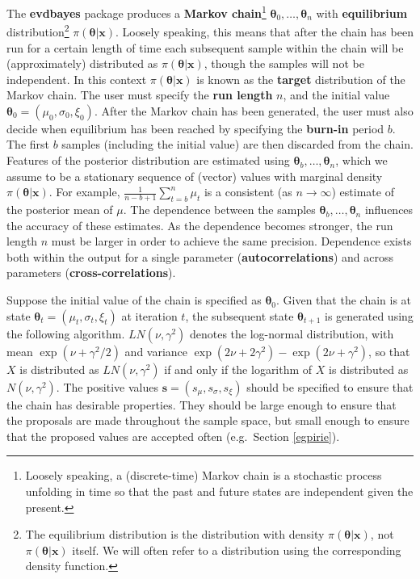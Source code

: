 \documentclass[11pt,a4paper]{article}
\newcommand{\bs}{\boldsymbol}
\begin{document}
The \textbf{evdbayes} package produces a \textbf{Markov chain}\footnote{Loosely speaking, a (discrete-time) Markov chain is a stochastic process unfolding in time so that the past and future states are independent given the present.} $\bs{\theta}_0,\dots,\bs{\theta}_n$ with \textbf{equilibrium} distribution\footnote{The equilibrium distribution is the distribution with density $\pi(\bs{\theta}|\bs{x})$, not $\pi(\bs{\theta}|\bs{x})$ itself. We will often refer to a distribution using the corresponding density function.} $\pi(\bs{\theta}|\bs{x})$.
Loosely speaking, this means that after the chain has been run for a certain length of time each subsequent sample within the chain will be (approximately) distributed as $\pi(\bs{\theta}|\bs{x})$, though the samples will not be independent.
In this context $\pi(\bs{\theta}|\bs{x})$ is known as the \textbf{target} distribution of the Markov chain.
The user must specify the \textbf{run length} $n$, and the initial value $\bs{\theta}_0 = (\mu_0,\sigma_0,\xi_0)$.
After the Markov chain has been generated, the user must also decide when equilibrium has been reached by specifying the \textbf{burn-in} period $b$.
The first $b$ samples (including the initial value) are then discarded from the chain. 
Features of the posterior distribution are estimated using $\bs{\theta}_b,\dots,\bs{\theta}_n$, which we assume to be a stationary sequence of (vector) values with marginal density $\pi(\bs{\theta}|\bs{x})$.
For example, $\frac{1}{n-b+1}\sum_{t=b}^n \mu_t$ is a consistent (as $n \rightarrow \infty$) estimate of the posterior mean of $\mu$.
The dependence between the samples $\bs{\theta}_b,\dots,\bs{\theta}_n$ influences the accuracy of these estimates.
As the dependence becomes stronger, the run length $n$ must be larger in order to achieve the same precision.
Dependence exists both within the output for a single parameter (\textbf{autocorrelations}) and across parameters (\textbf{cross-correlations}).

Suppose the initial value of the chain is specified as $\bs{\theta}_0$.
Given that the chain is at state $\bs{\theta}_t = (\mu_t,\sigma_t,\xi_t)$ at iteration $t$, the subsequent state $\bs{\theta}_{t+1}$ is generated using the following algorithm. $LN(\nu, \gamma^2)$ denotes the log-normal distribution, with mean $\exp(\nu + \gamma^2/2)$ and variance $\exp(2\nu + 2\gamma^2) - \exp(2\nu + \gamma^2)$, so that $X$ is distributed as $LN(\nu, \gamma^2)$ if and only if the logarithm of $X$ is distributed as $N(\nu, \gamma^2)$.
The positive values $\bs{s} = (s_\mu,s_\sigma,s_\xi)$ should be specified to ensure that the chain has desirable properties.
They should be large enough to ensure that the proposals are made throughout the sample space, but small enough to ensure that the proposed values are accepted often (e.g.\ Section \ref{egpirie}).
\end{document}
